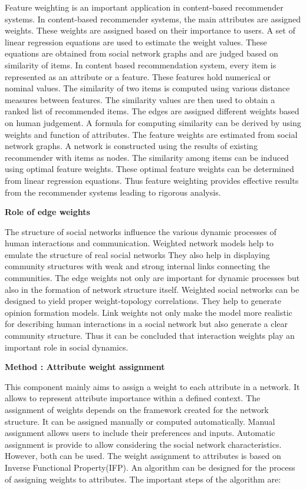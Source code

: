 Feature weighting is an important application in content-based recommender systems. In content-based recommender systems, the main attributes are assigned weights. These weights are assigned based on their importance to users. A set of linear regression equations are used to estimate the weight values. These equations are obtained from social network graphs and are judged based on similarity of items.
In content based recommendation system, every item is represented as an attribute or a feature. These features hold numerical or nominal values. The similarity of two items is computed using various distance measures between features. The similarity values are then used to obtain a ranked list of recommended items. The edges are assigned different weights based on human judgement. A formula for computing similarity can be derived by using weights and function of attributes. The feature weights are estimated from social network graphs. A network is constructed using the results of existing recommender with items as nodes. The similarity among items can be induced using optimal feature weights. These optimal feature weights can be determined from linear regression equations. Thus feature weighting provides effective results from the recommender systems leading to rigorous analysis.\cite{Debnath2008}

{\bf Role of edge weights} 

The structure of social networks influence the various dynamic processes of human interactions and communication. Weighted network models help to emulate the structure of real social networks They also help in displaying community structures with weak and strong internal links connecting the communities. The edge weights not only are important for dynamic processes but also in the formation of network structure itself. Weighted social networks can be designed to yield proper weight-topology correlations. They help to generate opinion formation models. Link weights not only make the model more realistic for describing human interactions in a social network but also generate a clear community structure. Thus it can be concluded that interaction weights play an important role in social dynamics. \cite{Toivonen2007}

{\bf Method : Attribute weight assignment}

This component mainly aims to assign a weight to each attribute in a network. It allows to represent attribute importance within a defined context. The assignment of weights depends on the framework created for the network structure. It can be assigned manually or computed automatically. Manual assignment allows users to include their preferences and inputs. Automatic assignment is provide to allow considering the social network characteristics. However, both can be used. The weight assignment to attributes is based on Inverse Functional Property(IFP). An algorithm can be designed for the process of assigning weights to attributes. The important steps of the algorithm are:

